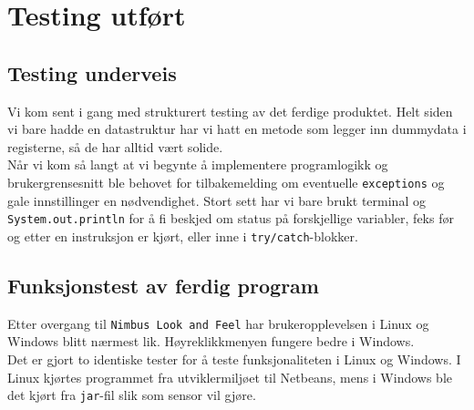 \section{Testing utført}
\subsection{Testing underveis}
Vi kom sent i gang med strukturert testing av det ferdige produktet. Helt siden vi bare hadde en datastruktur har vi hatt en metode som legger inn dummydata i registerne, så de har alltid vært solide.\\
Når vi kom så langt at vi begynte å implementere programlogikk og brukergrensesnitt ble behovet for tilbakemelding om eventuelle \texttt{exceptions} og gale innstillinger en nødvendighet. 
Stort sett har vi bare brukt terminal og \texttt{System.out.println} for å fi beskjed om status på forskjellige variabler, feks før og etter en instruksjon er kjørt, eller inne i \texttt{try/catch}-blokker.

\subsection{Funksjonstest av ferdig program}
Etter overgang til \texttt{Nimbus Look and Feel} har brukeropplevelsen i Linux og Windows blitt nærmest lik. Høyreklikkmenyen fungere bedre i Windows. \\
Det er gjort to identiske tester for å teste funksjonaliteten i Linux og Windows. I Linux kjørtes programmet fra utviklermiljøet til Netbeans, mens i Windows ble det kjørt fra \texttt{jar}-fil slik som sensor vil gjøre.

